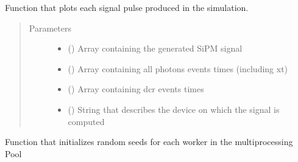 \documentclass[letterpaper,10pt,english]{sphinxmanual}
\begin{document}
\begin{fulllineitems}
\label{\detokenize{structure:libs.lib.sigPlot}}
Function that plots each signal pulse produced in the simulation.
\begin{quote}\begin{description}
\item[{Parameters}] \leavevmode\begin{itemize}
\item {} 
 () \textendash{} Array containing the generated SiPM signal

\item {} 
 () \textendash{} Array containing all photons events times (including xt)

\item {} 
 () \textendash{} Array containing dcr events times

\item {} 
 () \textendash{} String that describes the device on which the signal is computed

\end{itemize}

\end{description}\end{quote}

\end{fulllineitems}


\begin{fulllineitems}
\label{\detokenize{structure:libs.lib.initializeRandomPool}}
Function that initializes random seeds for each worker in the multiprocessing Pool

\end{fulllineitems}
\end{document}
